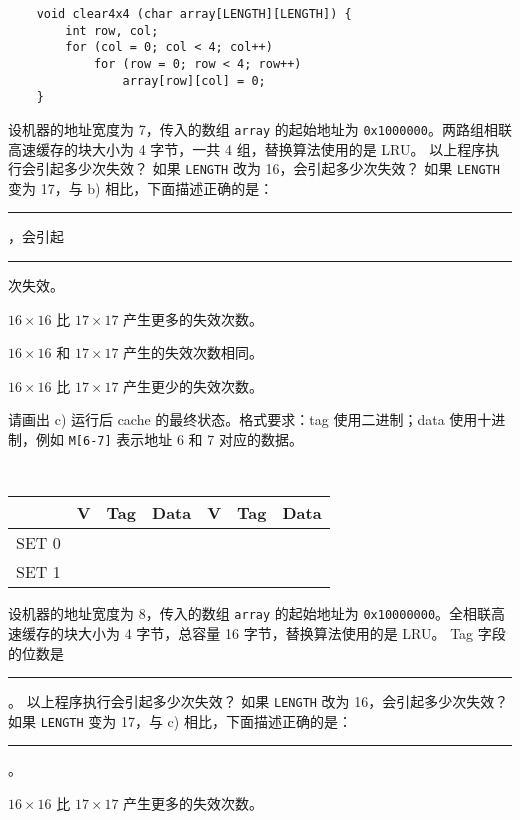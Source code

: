\begin{problems}
\begin{verbatim}
    void clear4x4 (char array[LENGTH][LENGTH]) {
        int row, col;
        for (col = 0; col < 4; col++)
            for (row = 0; row < 4; row++)
                array[row][col] = 0;
    }
        \end{verbatim}
        \qn 设机器的地址宽度为 7，传入的数组 \verb|array| 的起始地址为 \verb|0x1000000|。两路组相联高速缓存的块大小为 4 字节，一共 4 组，替换算法使用的是 LRU。
            \subqn 以上程序执行会引起多少次失效？
            \subqn 如果 \verb|LENGTH| 改为 16，会引起多少次失效？
            \subqn 如果 \verb|LENGTH| 变为 17，与 b) 相比，下面描述正确的是：\rule{1cm}{0.25mm}，会引起 \rule{2.5cm}{0.25mm} 次失效。
            \begin{choices}
                \item $16 \times 16$ 比 $17 \times 17$ 产生更多的失效次数。
                \item $16 \times 16$ 和 $17 \times 17$ 产生的失效次数相同。
                \item $16 \times 16$ 比 $17 \times 17$ 产生更少的失效次数。
            \end{choices}
            \subqn 请画出 c) 运行后 cache 的最终状态。格式要求：tag 使用二进制；data 使用十进制，例如 \verb|M[6-7]| 表示地址 6 和 7 对应的数据。
            \begin{table}[H]
                \tt
                \centering
                \begin{tabular}{|c|c|c|c|c|c|c|}
                    \hline
                    & {\quad V \quad} & {\quad Tag \quad} & {\quad Data \quad} & {\quad V \quad} & {\quad Tag \quad} & {\quad Data \quad} \\ \hline
                    SET 0 &  &  &  &  &  &  \\ \hline
                    SET 1 &  &  &  &  &  &  \\ \hline
                \end{tabular}
            \end{table}
        \qn 设机器的地址宽度为 8，传入的数组 \verb|array| 的起始地址为 \verb|0x10000000|。全相联高速缓存的块大小为 4 字节，总容量 16 字节，替换算法使用的是 LRU。
            \subqn Tag 字段的位数是 \rule{2.5cm}{0.25mm}。
            \subqn 以上程序执行会引起多少次失效？
            \subqn 如果 \verb|LENGTH| 改为 16，会引起多少次失效？
            \subqn 如果 \verb|LENGTH| 变为 17，与 c) 相比，下面描述正确的是：\rule{1cm}{0.25mm}。
            \begin{choices}
                \item $16 \times 16$ 比 $17 \times 17$ 产生更多的失效次数。

\end{choices}
\end{problems}
